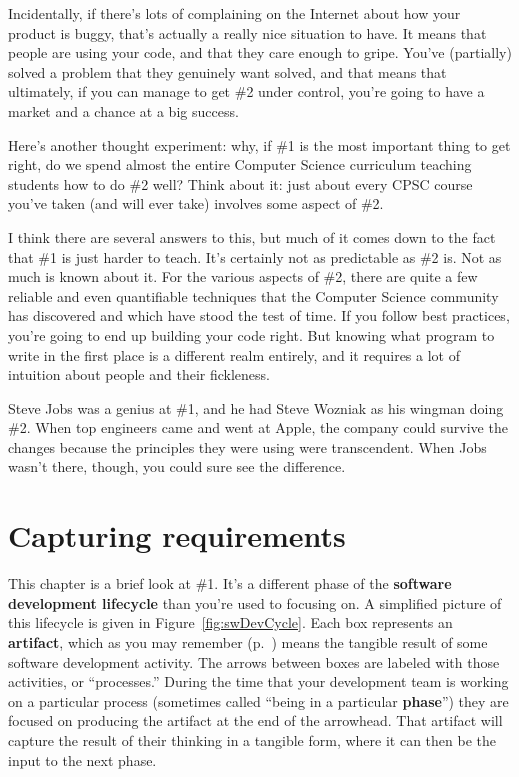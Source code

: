 Incidentally, if there's lots of complaining on the Internet about how your
product is buggy, that's actually a really nice situation to have. It means
that people are using your code, and that they care enough to gripe. You've
(partially) solved a problem that they genuinely want solved, and that means
that ultimately, if you can manage to get \#2 under control, you're going to
have a market and a chance at a big success.

Here's another thought experiment: why, if \#1 is the most important thing to
get right, do we spend almost the entire Computer Science curriculum teaching
students how to do \#2 well? Think about it: just about every CPSC course
you've taken (and will ever take) involves some aspect of \#2.

I think there are several answers to this, but much of it comes down to the
fact that \#1 is just harder to teach. It's certainly not as predictable as
\#2 is. Not as much is known about it. For the various aspects of \#2, there
are quite a few reliable and even quantifiable techniques that the Computer
Science community has discovered and which have stood the test of time. If you
follow best practices, you're going to end up building your code right. But
knowing what program to write in the first place is a different realm
entirely, and it requires a lot of intuition about people and their
fickleness. 

Steve Jobs was a genius at \#1, and he had Steve Wozniak as his wingman doing
\#2. When top engineers came and went at Apple, the company could survive the
changes because the principles they were using were transcendent. When Jobs
wasn't there, though, you could sure see the difference.

\section{Capturing requirements}

This chapter is a brief look at \#1. It's a different phase of the
\textbf{software development lifecycle} than you're used to focusing on. A
simplified picture of this lifecycle is given in Figure~\ref{fig:swDevCycle}.
Each box represents an \textbf{artifact}, which as you may remember
(p.~\pageref{artifact}) means the tangible result of some software development
activity. The arrows between boxes are labeled with those activities, or
``processes.'' During the time that your development team is working on a
particular process (sometimes called ``being in a particular \textbf{phase}'')
they are focused on producing the artifact at the end of the arrowhead. That
artifact will capture the result of their thinking in a tangible form, where
it can then be the input to the next phase.

